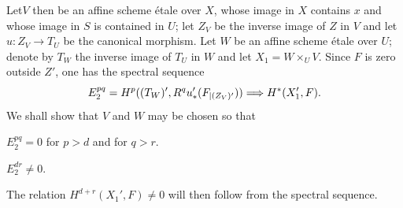 Let\pageoriginale $V$ then be an affine scheme \'{e}tale over $X$, whose image in $X$ contains $x$ and whose image in $S$ is contained in $U$; let $Z_V$ be the inverse image of $Z$ in $V$ and let $u: Z_V \to T_U$ be the canonical morphism. Let\sisi{}{} $W$ be an affine scheme \'{e}tale over $U$; denote by $T_W$ the inverse image of $T_U$ in $W$ and let $X_1 = W\times_U V$. Since $F$ is zero outside $Z'$, one has the spectral sequence
$$
E^{pq}_2 = H^p((T_W)', R^qu_*'(F_{|(Z_V)'})) \Longrightarrow H^*(X'_1, F).
$$
We shall show that $V$ and $W$ may be chosen so that
\begin{enumeratea}
\item
$E^{pq}_2=0$ for $p>d$ and for $q>r$.
\item
$E^{dr}_2 \neq 0$.
\end{enumeratea}
\noindent
The relation $H^{d+r}(X_1', F) \neq 0$ will then follow from the spectral sequence.
